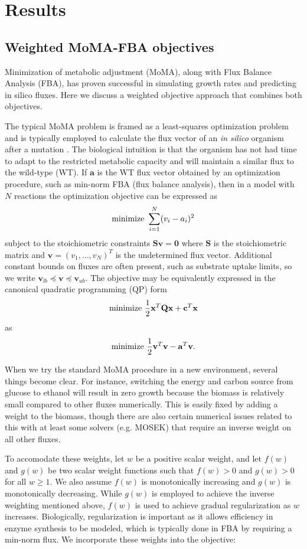 \section{Results}

\subsection{Weighted MoMA-FBA objectives}

Minimization of metabolic adjustment (MoMA), along with Flux Balance
Analysis (FBA), has proven successful in simulating growth rates and
predicting in silico fluxes. Here we discuss a weighted objective
approach that combines both objectives. 

The typical MoMA problem is framed as a least-squares optimization
problem and is typically employed to calculate the flux vector of an
\emph{in silico} organism after a mutation \cite{Segre2002_sb2013}.
The biological intuition is that the organism has not had time to
adapt to the restricted metabolic capacity and will maintain a similar
flux to the wild-type (WT). If $\mathbf{a}$ is the WT flux vector
obtained by an optimization procedure, such as min-norm FBA (flux
balance analysis), then in a model with $N$ reactions the optimization
objective can be expressed as
\[ \textnormal{minimize}\ \sum^N_{i=1}(v_i-a_i)^2 \] 
subject to the stoichiometric constraints $\mathbf{S v} =
\mathbf{0}$ where $\mathbf{S}$ is the
stoichiometric matrix and $\mathbf{v} =
(v_1, \ldots, v_N)^T$ is the undetermined flux vector.  
Additional constant bounds on fluxes are often
present, such as substrate uptake limits, so we write $\mathbf{v}_{lb}
\preceq \mathbf{v} \preceq \mathbf{v}_{ub}$. The objective may be
equivalently expressed in the canonical quadratic programming (QP)
form
\[ \textnormal{minimize}\ \frac{1}{2}\mathbf{x}^T \mathbf{Q x} + \mathbf{c}^T \mathbf{x}\]
as  
\[ \textnormal{minimize}\ \frac{1}{2}\mathbf{v}^T \mathbf{v} - \mathbf{a}^T \mathbf{v}\textnormal{.}\]

When we try the standard MoMA procedure in a new environment, several
things become clear. For instance, switching the energy and carbon
source from glucose to ethanol will result in zero growth because the
biomass is relatively small compared to other fluxes numerically.
This is easily fixed by adding a weight to the biomass, though there
are also certain numerical issues related to this with at least some
solvers (e.g. MOSEK) that require an inverse weight on all other
fluxes.

To accomodate these weights, let $w$ be a positive scalar weight, and
let $f(w)$ and $g(w)$ be two scalar weight functions such that $f(w) >
0$ and $g(w) > 0$ for all $w \ge 1$. We also assume $f(w)$ is
monotonically increasing and $g(w)$ is monotonically decreasing. While
$g(w)$ is employed to achieve the inverse weighting mentioned above,
$f(w)$ is used to achieve gradual regularization as $w$
increases. Biologically, regularization is important as it allows
efficiency in enzyme synthesis to be modeled, which is typically done
in FBA by requiring a min-norm flux.  We incorporate these weights
into the objective:

